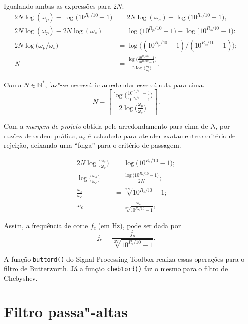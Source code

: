 Igualando ambas as expressões para $2N$:
\begin{align*}
	2N\log(\omega_p)-\log\big(10^{R_p/10}-1\big)&=2N\log(\omega_s)-\log\big(10^{R_s/10}-1\big);\\
	2N\log(\omega_p)-2N\log(\omega_s)&=\log\big(10^{R_p/10}-1\big)-\log\big(10^{R_s/10}-1\big);\\
	2N\log\big(\omega_p/\omega_s\big)&=\log\big((10^{R_p/10}-1)/(10^{R_s/10}-1)\big);\\
	N&=\frac{\displaystyle\log\Big(\frac{10^{R_p/10}-1}{10^{R_s/10}-1}\Big)}{\displaystyle2\log\Big(\frac{\omega_p}{\omega_s}\Big)}.
\end{align*}

Como $N\in\mathbb{N}^*$, faz"-se necessário arredondar esse cálcula para cima:
\begin{equation}\label{eq:buttord}
	\boxed{N=\left\lceil\frac{\displaystyle\log\Big(\frac{10^{R_p/10}-1}{10^{R_s/10}-1}\Big)}{\displaystyle2\log\Big(\frac{\omega_p}{\omega_s}\Big)}\right\rceil.}
\end{equation}

Com a \emph{margem de projeto} obtida pelo arredondamento para cima de $N$, por razões de ordem prática, $\omega_c$ é calculado para atender exatamente o critério de rejeição, deixando uma \enquote{folga} para o critério de passagem.

\begin{align*}
	2N\log\Big(\frac{\omega_s}{\omega_c}\Big)&=\log\big(10^{R_s/10}-1\big);\\
	\log\Big(\frac{\omega_s}{\omega_c}\Big)&=\frac{\log\big(10^{R_s/10}-1\big)}{2N};\\
	\frac{\omega_s}{\omega_c}&=\sqrt[2N]{10^{R_s/10}-1};\\
	\omega_c&=\frac{\omega_s}{\sqrt[2N]{10^{R_s/10}-1}};
\end{align*}

Assim, a frequência de corte $f_c$ (em \unit{\hertz}), pode ser dada por
\begin{equation}\label{eq:buttfc}
	\boxed{f_c=\frac{f_s}{\sqrt[2N]{10^{R_s/10}-1}}.}
\end{equation}

A função \lstinline{buttord()} do Signal Processing Toolbox realiza essas operações para o filtro de Butterworth. Já a função \lstinline{cheb1ord()} faz o mesmo para o filtro de Chebyshev.

\section{Filtro passa"-altas}

